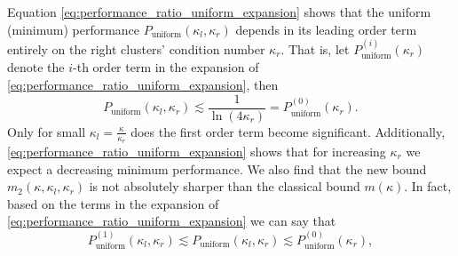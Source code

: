 Equation \ref{eq:performance_ratio_uniform_expansion} shows that the uniform (minimum) performance $P_{\text{uniform}}(\kappa_l, \kappa_r)$ depends in its leading order term entirely on the right clusters' condition number $\kappa_r$. That is, let $P^{(i)}_{\text{uniform}}(\kappa_r)$ denote the $i$-th order term in the expansion of \cref{eq:performance_ratio_uniform_expansion}, then
\[
    P_{\text{uniform}}(\kappa_l, \kappa_r) \lesssim \frac{1}{\ln(4\kappa_r)} = P^{(0)}_{\text{uniform}}(\kappa_r).
\]
Only for small $\kappa_l = \frac{\kappa}{\kappa_r}$ does the first order term become significant. Additionally, \cref{eq:performance_ratio_uniform_expansion} shows that for increasing $\kappa_r$ we expect a decreasing minimum performance. We also find that the new bound $m_2(\kappa,\kappa_l,\kappa_r)$ is not absolutely sharper than the classical bound $m(\kappa)$. In fact, based on the terms in the expansion of \cref{eq:performance_ratio_uniform_expansion} we can say that
\begin{equation}
    P^{(1)}_{\text{uniform}}(\kappa_l, \kappa_r) \lesssim P_{\text{uniform}}(\kappa_l, \kappa_r) \lesssim P^{(0)}_{\text{uniform}}(\kappa_r),
    \label{eq:performance_ratio_no_improvement_bounds}
\end{equation}

